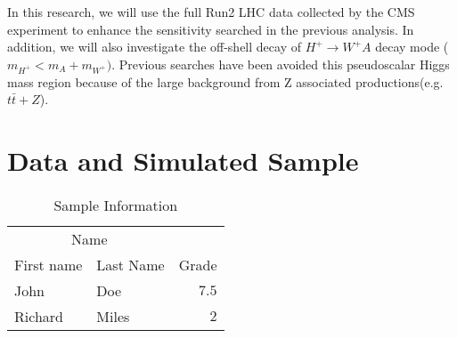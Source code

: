 \documentclass[
12pt, %
a4paper, %
oneside, %
headinclude,footinclude, %
BCOR5mm, %
]{scrartcl}
\begin{document}
In this research, we will use the full Run2 LHC data collected by the CMS experiment
to enhance the sensitivity searched in the previous analysis.
In addition, we will also investigate the off-shell decay of $H^+ \rightarrow W^+A$ decay mode 
($m_{H^+} < m_A + m_{W^+})$. Previous searches have been avoided this 
pseudoscalar Higgs mass region because of the large background from Z associated productions(e.g. $t\bar{t}+Z$).

\section{Data and Simulated Sample}


\begin{table}[hbt]
    \caption{Sample Information}
    \centering
    \begin{tabular}{llr}
    \toprule
    \multicolumn{2}{c}{Name} \\
    \cmidrule(r){1-2}
    First name & Last Name & Grade \\
    \midrule
    John & Doe & $7.5$ \\
    Richard & Miles & $2$ \\
    \bottomrule
    \end{tabular}
    \label{tab:label}
\end{table}
\end{document}
